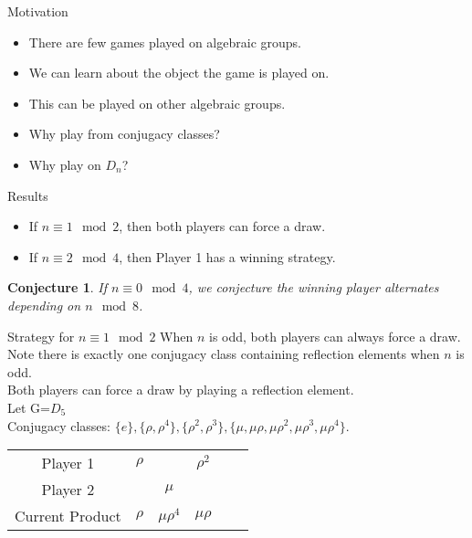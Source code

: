 \documentclass{beamer}
\newtheorem{conjecture}{Conjecture}
\begin{document}
\begin{frame}{Motivation}
    \begin{itemize}
        \item There are few games played on algebraic groups.
        \medskip 
        \item We can learn about the object the game is played on.
        \medskip
        \item This can be played on other algebraic groups.
        \medskip
        \item Why play from conjugacy classes?
        \medskip
        \item Why play on $D_n$?
    \end{itemize}
\end{frame}

\begin{frame}{Results}

\begin{Theorem}[C., M., R., T.]
    \begin{itemize}
        \item If $n\equiv 1 \mod 2$, then both players can force a draw.
        \item If $n\equiv 2 \mod 4$, then Player 1 has a winning strategy.
        \end{itemize}
\end{Theorem}
\begin{conjecture}
        If $n\equiv 0 \mod 4$, we conjecture the winning player alternates depending on $n\mod 8$.
\end{conjecture}
    
\end{frame}
\begin{frame}{Strategy for $n \equiv 1 \mod 2$}
When $n$ is odd, both players can always force a draw.\\
\medskip
Note there is exactly one conjugacy class containing reflection elements when $n$ is odd.\\
\medskip
Both players can force a draw by playing a reflection element.\\
\bigskip
Let G=$D_5$\\
Conjugacy classes: $\{e\}, \{\rho,\rho^4\},\{\rho^2,\rho^3\},\{\mu,\mu\rho, \mu\rho^2, \mu\rho^3, \mu\rho^4\}$.\\
    \begin{tabular}{c|ccccc}
    \hline
        Player 1 & {$\rho$} & & {$\rho^2$} \\
        Player 2 & & {$\mu$} & \\
    \hline 
        Current Product & {$\rho$} & {$\mu\rho^4$} & {$\mu\rho$}
    \end{tabular}\\
\end{frame}
\end{document}
